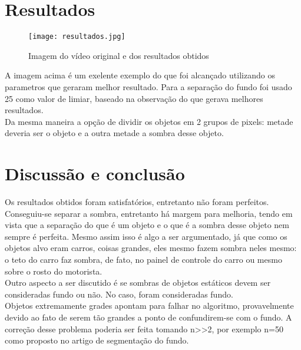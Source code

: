 \documentclass[twoside]{article}
\begin{document}
\begin{multicols}{2}
\section{Resultados}

\begin{figure}[H]
\centering
\texttt{[image: resultados.jpg]}
\caption{Imagem do vídeo original e dos resultados obtidos}
\label{overflow}
\end{figure}

A imagem acima é um exelente exemplo do que foi alcançado utilizando os parametros que geraram melhor resultado. Para a separação do fundo foi usado 25 como valor de limiar, baseado na observação do que gerava melhores resultados.\\Da mesma maneira a opção de dividir os objetos em 2 grupos de pixels: metade deveria ser o objeto e a outra metade a sombra desse objeto.






\section{Discussão e conclusão}

Os resultados obtidos foram satisfatórios, entretanto não foram perfeitos. Conseguiu-se separar a sombra, entretanto há margem para melhoria, tendo em vista que a separação do que é um objeto e o que é a sombra desse objeto nem sempre é perfeita. Mesmo assim isso é algo a ser argumentado, já que como os objetos alvo eram carros, coisas grandes, eles mesmo fazem sombra neles mesmo: o teto do carro faz sombra, de fato, no painel de controle do carro ou mesmo sobre o rosto do motorista.\\
Outro aspecto a ser discutido é se sombras de objetos estáticos devem ser consideradas fundo ou não. No caso, foram consideradas fundo.
\\Objetos extremamente grades apontam para falhar no algoritmo, provavelmente devido ao fato de serem tão grandes a ponto de confundirem-se com o fundo. A correção desse problema poderia ser feita tomando n>>2, por exemplo n=50 como proposto no artigo de segmentação do fundo.


\end{multicols}
\end{document}
